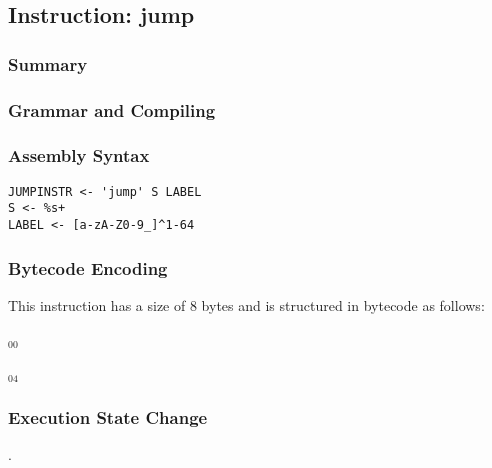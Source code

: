\subsection{Instruction: jump}

\subsubsection{Summary}


\subsubsection{Grammar and Compiling}


\subsubsection{Assembly Syntax}

\begin{myquote}
\begin{verbatim}
JUMPINSTR <- 'jump' S LABEL
S <- %s+
LABEL <- [a-zA-Z0-9_]^1-64
\end{verbatim}
\end{myquote}


\subsubsection{Bytecode Encoding}

This instruction has a size of 8 bytes and is structured in bytecode as follows:

$_{00}$\ 



$_{04}$\ 


\subsubsection{Execution State Change}

.


